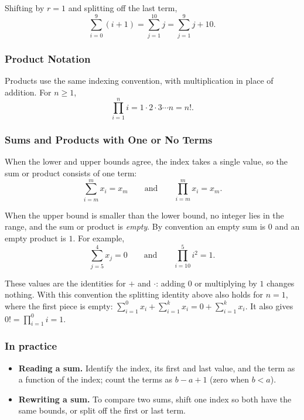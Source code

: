 \begin{example}
    Shifting by $r=1$ and splitting off the last term,
    \begin{equation*}
        \sum_{i=0}^{9}(i+1)=\sum_{j=1}^{10}j=\sum_{j=1}^{9}j+10.
    \end{equation*}
\end{example}

\subsubsection{Product Notation}
Products use the same indexing convention, with multiplication in place of
addition. For $n\geq 1$,
\begin{equation*}
    \prod_{i=1}^{n}i=1\cdot2\cdot3\cdots n=n!.
\end{equation*}

\subsubsection{Sums and Products with One or No Terms}
When the lower and upper bounds agree, the index takes a single value, so
the sum or product consists of one term:
\begin{equation*}
    \sum_{i=m}^{m}x_i=x_m \qquad\text{and}\qquad \prod_{i=m}^{m}x_i=x_m.
\end{equation*}

When the upper bound is smaller than the lower bound, no integer lies in the
range, and the sum or product is \emph{empty}. By convention an empty sum is
$0$ and an empty product is $1$. For example,
\begin{equation*}
    \sum_{j=5}^{4}x_j=0 \qquad\text{and}\qquad \prod_{i=10}^{5}i^2=1.
\end{equation*}
\begin{remark}
    These values are the identities for $+$ and $\cdot$: adding $0$ or
    multiplying by $1$ changes nothing. With this convention the splitting
    identity above also holds for $n=1$, where the first piece is empty:
    $\sum_{i=1}^{0}x_i+\sum_{i=1}^{k}x_i=0+\sum_{i=1}^{k}x_i$.
    It also gives $0!=\prod_{i=1}^{0}i=1$.
\end{remark}

\subsubsection*{In practice}
\begin{itemize}
    \item \textbf{Reading a sum.} Identify the index, its first and last
    value, and the term as a function of the index; count the terms as
    $b-a+1$ (zero when $b<a$).
    \item \textbf{Rewriting a sum.} To compare two sums, shift one index so
    both have the same bounds, or split off the first or last term.
\end{itemize}